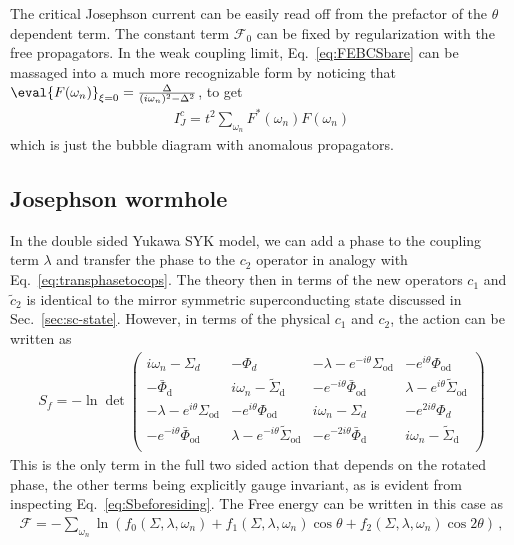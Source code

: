 The critical Josephson current can be easily read off from the prefactor of the $\theta$ dependent term. The constant term $\mathcal{F}_0$ can be fixed by regularization with the free propagators. 
%
In the weak coupling limit, Eq.~\eqref{eq:FEBCSbare} can be massaged into a much more recognizable form by noticing that $\eval{F(\omega_n)}_{\xi=0} = \frac{\Delta}{(i\omega_n)^2 - \Delta^2}$, to get 
\begin{align}
    I_J^c = t^2 \sum_{\omega_n} F^\ast(\omega_n) F(\omega_n) 
\end{align}
which is just the bubble diagram with anomalous propagators.
%
\subsection{Josephson wormhole}
In the double sided Yukawa SYK model, we can add a phase to the coupling term $\lambda$ and transfer the phase to the $c_2$ operator in analogy with Eq.~\eqref{eq:transphasetocops}. The theory then in terms of the new operators $c_1$ and $\tilde{c}_2$ is identical to the mirror symmetric superconducting state discussed in Sec.~\ref{sec:sc-state}. 
%
However, in terms of the physical $c_1$ and $c_2$, the action can be written as 
\begin{align}
    S_f = -\ln\det
    \left(
    \begin{array}{cccc}
     i \omega _n -\Sigma _d  & -\Phi _d & -\lambda -e^{-i \theta } \Sigma _{\text{od}} & -e^{i \theta } \Phi _{\text{od}} \\
     -\bar{\Phi} _{\text{d}} & i \omega_n -\tilde{\Sigma} _{\text{d}}  & -e^{-i \theta } \bar{\Phi} _{\text{od}} & \lambda -e^{i \theta } \tilde{\Sigma} _{\text{od}} \\
     -\lambda -e^{i \theta } \Sigma _{\text{od}} & -e^{i \theta } \Phi _{\text{od}} & i \omega_n-\Sigma _d  & -e^{2 i \theta } \Phi _d \\
     -e^{-i \theta } \bar{\Phi} _{\text{od}} & \lambda -e^{-i \theta } \tilde{\Sigma} _{\text{od}} & -e^{-2 i \theta } \bar{\Phi} _{\text{d}} & i \omega_n -\tilde{\Sigma} _{\text{d}} \\
    \end{array}
    \right)
\end{align}
This is the only term in the full two sided action that depends on the rotated phase, the other terms being explicitly gauge invariant, as is evident from inspecting Eq.~\eqref{eq:Sbeforesiding}. The Free energy can be written in this case as 
\begin{align}
    \mathcal{F}  = -\sum_{\omega_n}\ln\left( f_0(\Sigma,\lambda,\omega_n) + f_1(\Sigma,\lambda,\omega_n) \cos\theta + f_2(\Sigma,\lambda,\omega_n)\cos{2\theta}\right) \,,
    \label{eq:exactFEJosWH}
\end{align}

